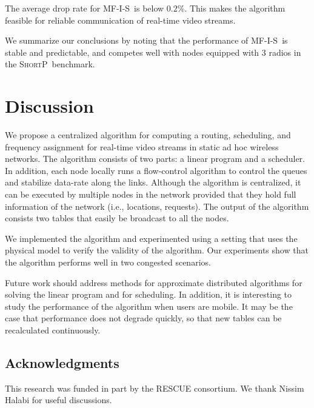 \documentclass[12pt]{article}
\newenvironment{proof sketch}[1]{\noindent {\emph{Proof sketch of #1:}}}{\hfill \qed}
\newcommand{\algA}{\textsc{MF-I-S}}
\newcommand{\algB}{\textsc{ShortP}}
\newcommand{\algS}{\algB}
\begin{document}
The average drop rate for \algA\ is below $0.2$\%. This makes the algorithm
feasible for reliable communication of real-time video streams.

We summarize our conclusions by noting that the performance of \algA\
is stable and predictable, and competes well with nodes equipped with
$3$ radios in the \algS\ benchmark.

\section{Discussion}
We propose a centralized algorithm for computing a routing,
scheduling, and frequency assignment for real-time video streams in
static ad hoc wireless networks.  The algorithm consists of two parts:
a linear program and a scheduler.  In addition, each node locally runs
a flow-control algorithm to control the queues and stabilize data-rate
along the links.  Although the algorithm is centralized, it can be
executed by multiple nodes in the network provided that they hold full
information of the network (i.e., locations, requests).  The output of
the algorithm consists two tables that easily be broadcast to all the
nodes.

We implemented the algorithm and experimented using a setting that
uses the physical model to verify the validity of the algorithm.  Our
experiments show that the algorithm performs well in two congested
scenarios.  

Future work should address methods for approximate distributed
algorithms for solving the linear program and for scheduling. In
addition, it is interesting to study the performance of the algorithm
when users are mobile.  It may be the case that performance does not
degrade quickly, so that new tables can be recalculated continuously.


%
\ifnum{}
  \subsection*{Acknowledgments}
This research was funded in part by the RESCUE consortium.
  We thank Nissim Halabi for useful discussions.
\fi
%



\end{document}
